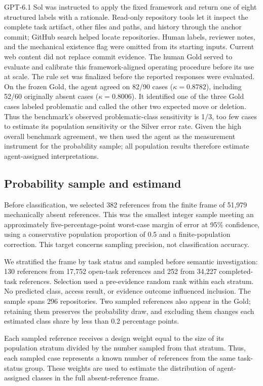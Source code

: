 \documentclass[10pt,conference]{IEEEtran}
\begin{document}
GPT-6.1 Sol was instructed to apply the fixed framework and return one of eight structured labels with a rationale. Read-only repository tools let it inspect the complete task artifact, other files and paths, and history through the anchor commit; GitHub search helped locate repositories. Human labels, reviewer notes, and the mechanical existence flag were omitted from its starting inputs. Current web content did not replace commit evidence. The human Gold served to evaluate and calibrate this framework-aligned operating procedure before its use at scale. The rule set was finalized before the reported responses were evaluated. On the frozen Gold, the agent agreed on 82/90 cases ($\kappa=0.8782$), including 52/60 originally absent cases ($\kappa=0.8006$). It identified one of the three Gold cases labeled problematic and called the other two expected move or deletion. Thus the benchmark's observed problematic-class sensitivity is 1/3, too few cases to estimate its population sensitivity or the Silver error rate. Given the high overall benchmark agreement, we then used the agent as the measurement instrument for the probability sample; all population results therefore estimate agent-assigned interpretations.

\subsection{Probability sample and estimand}
Before classification, we selected 382 references from the finite frame of 51,979 mechanically absent references. This was the smallest integer sample meeting an approximately five-percentage-point worst-case margin of error at 95\% confidence, using a conservative population proportion of 0.5 and a finite-population correction. This target concerns sampling precision, not classification accuracy.

We stratified the frame by task status and sampled before semantic investigation: 130 references from 17,752 open-task references and 252 from 34,227 completed-task references. Selection used a pre-evidence random rank within each stratum. No predicted class, access result, or evidence outcome influenced inclusion. The sample spans 296 repositories. Two sampled references also appear in the Gold; retaining them preserves the probability draw, and excluding them changes each estimated class share by less than 0.2 percentage points.

Each sampled reference receives a design weight equal to the size of its population stratum divided by the number sampled from that stratum. Thus, each sampled case represents a known number of references from the same task-status group. These weights are used to estimate the distribution of agent-assigned classes in the full absent-reference frame.
\end{document}
